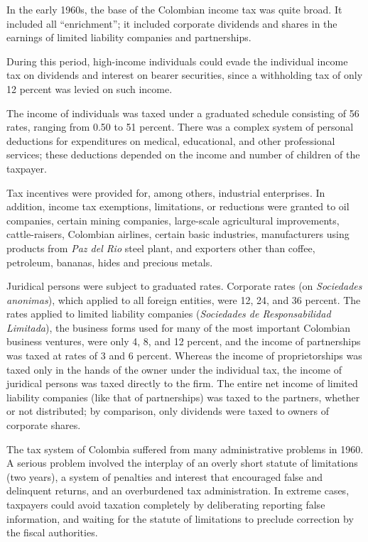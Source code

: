 \documentclass[
  12pt]{article}
\theoremstyle{definition}
\theoremstyle{remark}
\begin{document}
In the early 1960s, the base of the Colombian income tax was quite
broad. It included all ``enrichment''; it included corporate dividends
and shares in the earnings of limited liability companies and
partnerships.

During this period, high-income individuals could evade the individual
income tax on dividends and interest on bearer securities, since a
withholding tax of only 12 percent was levied on such income.

The income of individuals was taxed under a graduated schedule
consisting of 56 rates, ranging from 0.50 to 51 percent. There was a
complex system of personal deductions for expenditures on medical,
educational, and other professional services; these deductions depended
on the income and number of children of the taxpayer.

Tax incentives were provided for, among others, industrial enterprises.
In addition, income tax exemptions, limitations, or reductions were
granted to oil companies, certain mining companies, large-scale
agricultural improvements, cattle-raisers, Colombian airlines, certain
basic industries, manufacturers using products from \emph{Paz del Rio}
steel plant, and exporters other than coffee, petroleum, bananas, hides
and precious metals.

Juridical persons were subject to graduated rates. Corporate rates (on
\emph{Sociedades anonimas}), which applied to all foreign entities, were
12, 24, and 36 percent. The rates applied to limited liability companies
(\emph{Sociedades de Responsabilidad Limitada}), the business forms used
for many of the most important Colombian business ventures, were only 4,
8, and 12 percent, and the income of partnerships was taxed at rates of
3 and 6 percent. Whereas the income of proprietorships was taxed only in
the hands of the owner under the individual tax, the income of juridical
persons was taxed directly to the firm. The entire net income of limited
liability companies (like that of partnerships) was taxed to the
partners, whether or not distributed; by comparison, only dividends were
taxed to owners of corporate shares.

The tax system of Colombia suffered from many administrative problems in
1960. A serious problem involved the interplay of an overly short
statute of limitations (two years), a system of penalties and interest
that encouraged false and delinquent returns, and an overburdened tax
administration. In extreme cases, taxpayers could avoid taxation
completely by deliberating reporting false information, and waiting for
the statute of limitations to preclude correction by the fiscal
authorities.
\end{document}
